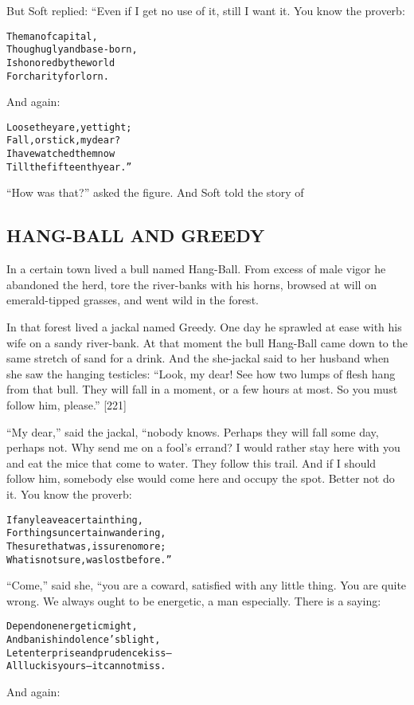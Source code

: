 \documentclass{article}
\renewenvironment{verbatim}{\begin{alltt}\normalfont\begin{centering}}{\end{centering}\end{alltt}}
\begin{document}
But Soft replied: “Even if I get no use of it, still I want it. You
know the proverb:

\begin{verbatim}
The man of capital,
    Though ugly and base-born,
Is honored by the world
    For charity forlorn.
\end{verbatim}
And again:

\begin{verbatim}
Loose they are, yet tight;
    Fall, or stick, my dear?
I have watched them now
    Till the fifteenth year.”
\end{verbatim}
``How was that?'' asked the figure. And Soft told the story of

\subsection{HANG-BALL AND GREEDY}

In a certain town lived a bull named Hang-Ball. From excess of male
vigor he abandoned the herd, tore the river-banks with his horns,
browsed at will on emerald-tipped grasses, and went wild in the
forest.

In that forest lived a jackal named Greedy. One day he sprawled at
ease with his wife on a sandy river-bank. At that moment the bull
Hang-Ball came down to the same stretch of sand for a drink. And
the she-jackal said to her husband when she saw the hanging
testicles:
``Look, my dear! See how two lumps of flesh hang from that bull. They will fall in a moment, or a few hours at most. So you must follow him, please.''
[221]

``My dear,'' said the jackal, “nobody knows. Perhaps they will fall
some day, perhaps not. Why send me on a fool's errand? I would
rather stay here with you and eat the mice that come to water. They
follow this trail. And if I should follow him, somebody else would
come here and occupy the spot. Better not do it. You know the
proverb:

\begin{verbatim}
If any leave a certain thing,
For things uncertain wandering,
The sure that was, is sure no more;
What is not sure, was lost before.”
\end{verbatim}
``Come,'' said she, “you are a coward, satisfied with any little
thing. You are quite wrong. We always ought to be energetic, a man
especially. There is a saying:

\begin{verbatim}
Depend on energetic might,
And banish indolence's blight,
Let enterprise and prudence kiss--
All luck is yours--it cannot miss.
\end{verbatim}
And again:
\end{document}
